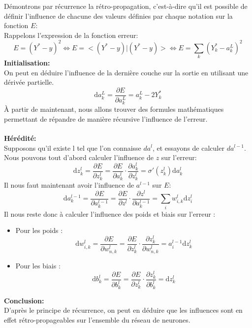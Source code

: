 \documentclass[12pt,a4paper]{extarticle}
\newcommand{\ud}{\mathrm{d}}
\begin{document}
Démontrons par récurrence la rétro-propagation, c'est-à-dire qu'il est possible de définir l'influence de chacune des valeurs définies par chaque notation sur la fonction $E$: \\
Rappelons l'expression de la fonction erreur:
\[E=(Y^*-y)^2\Leftrightarrow E = <(Y^*-y)|(Y^*-y)> \Leftrightarrow E = \sum_k(Y^*_k-a^L_k)^2 \]
\textbf{Initialisation:} \\ 
\indent On peut en déduire l'influence de la dernière couche sur la sortie en utilisant une dérivée partielle.
\[\ud a^L_k=\frac{\partial E}{\partial a^L_k}=a^L_k-2Y^*_k\]
À partir de maintenant, nous allons trouver des formules mathématiques permettant de répandre de manière récursive l'influence de l'erreur.\\ \\
\textbf{Hérédité:}\\
\indent Supposons qu'il existe l tel que l'on connaisse $da^l$, et essayons de calculer $da^{l-1}$.
Nous pouvons tout d'abord calculer l'influence de $z$ sur l'erreur:
\[\ud z^l_k=\frac{\partial E}{\partial z^l_k}=\frac{\partial E}{\partial a^l_k}\cdot \frac{\partial a^l_k}{\partial z^l_k}=\sigma'(z^l_k)\ud a^l_k\]
Il nous faut maintenant avoir l'influence de $a^{l-1}$ sur $E$:
\[\ud a^{l-1}_k=\frac{\partial E}{\partial a^{l-1}_k}=\frac{\partial E}{\partial z^l}\cdot\frac{\partial z^l}{\partial a^{l-1}_k}=\sum_i  w^l_{i,k}\ud z^l_i\]
Il nous reste donc à calculer l'influence des poids et biais sur l'erreur :\\
\begin{itemize}
\item Pour les poids :
\[\ud w^l_{i,k}=\frac{\partial E}{\partial w^l_{n,k}}=\frac{\partial E}{\partial z^l_k}\cdot \frac{\partial z^l_k}{\partial w^l_{n,k}}=a^{l-1}_i\ud z^l_k\]
\item Pour les biais :
\[\ud b^l_k=\frac{\partial E}{\partial b^l_k}=\frac{\partial E}{\partial z^l_k}\cdot \frac{\partial z^l_k}{\partial b^l_k}=\ud z^l_k\]
\end{itemize} 
\textbf{Conclusion:}\\
\indent D'après le principe de récurrence, on peut en déduire que les influences sont en effet rétro-propageables sur l'ensemble du réseau de neurones.\\
\end{document}
